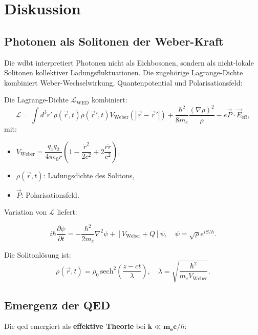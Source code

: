 \chapter{Diskussion}

\section{Photonen als Solitonen der Weber-Kraft}
Die \gls{wdbt} interpretiert Photonen nicht als Eichbosonen, sondern als nicht-lokale Solitonen kollektiver Ladungsfluktuationen. Die zugehörige Lagrange-Dichte kombiniert Weber-Wechselwirkung,
Quantenpotential und Polarisationsfeld:

Die Lagrange-Dichte $\mathcal{L}_{\text{WED}}$ kombiniert:  
\begin{equation}
\mathcal{L} = \int d^3r'\, \rho(\vec{r},t) \rho(\vec{r}',t) V_{\text{Weber}}(|\vec{r}-\vec{r}'|) + \frac{\hbar^2}{8m_e} \frac{(\nabla \rho)^2}{\rho} - e \vec{P} \cdot \vec{E}_{\text{eff}},
\end{equation}
mit:
\begin{itemize}
    \item $V_{\text{Weber}} = \dfrac{q_1 q_2}{4\pi \epsilon_0 r} \left(1 - \dfrac{\dot{r}^2}{2c^2} + 2 \dfrac{r \ddot{r}}{c^2}\right)$,
    \item $\rho(\vec{r},t)$: Ladungsdichte des Solitons,
    \item $\vec{P}$: Polarisationsfeld.
\end{itemize}

Variation von $\mathcal{L}$ liefert:  

\begin{equation}
i\hbar \frac{\partial \psi}{\partial t} = -\frac{\hbar^2}{2m_e} \nabla^2 \psi + \left[ V_{\text{Weber}} + Q \right] \psi, \quad \psi = \sqrt{\rho} e^{iS/\hbar}.
\end{equation}

Die Solitonlösung ist:
\begin{equation}
\rho(\vec{r},t) = \rho_0 \, \text{sech}^2\left(\frac{z - ct}{\lambda}\right), \quad \lambda = \sqrt{\frac{\hbar^2}{m_e V_{\text{Weber}}}}.
\end{equation}

\section{Emergenz der QED}
Die \gls{qed} emergiert als \textbf{effektive Theorie} bei $\mathbf{k \ll m_e c/\hbar}$:

